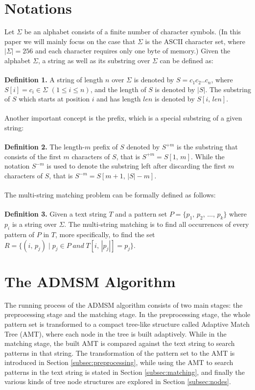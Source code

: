 \documentclass[legalpaper]{article}
\begin{document}
\section{Notations}
\label{sec:stucture}

Let $\Sigma$ be an \textsf{alphabet} consists of a finite number of
character symbols. (In this paper we will mainly focus on the case
that $\Sigma$ is the ASCII character set, where $|\Sigma| = 256$ and
each character requires only one byte of memory.) Given the alphabet
$\Sigma$, a \textsf{string} as well as its \textsf{substring} over
$\Sigma$ can be defined as:\\
\\
\textbf{Definition 1.} A \textsf{string} of length $n$ over $\Sigma$ is
denoted by $S = c_1c_2..c_n$, where $S[i] = c_i \in \Sigma$ $(1 \leq i
\leq n)$, and the length of $S$ is denoted by $|S|$. The
\textsf{substring} of $S$ which starts at position $i$ and has
length $len$ is denoted by $S[i,\,len]$.\\
\\
Another important concept is the \textsf{prefix}, which is a special
substring of a given string:\\
\\
\textbf{Definition 2.} The length-$m$ \textsf{prefix} of $S$ denoted by
$S^{+m}$ is the substring that consists of the first $m$ characters of
$S$, that is $S^{+m}=S[1,\,m]$.  While the notation $S^{-m}$ is used to
denote the substring left after discarding the first $m$ characters of $S$, that is $S^{-m} = S[m+1,\,|S|-m]$.\\
\\
The \textsf{multi-string matching} problem can be formally defined as follows: \\
\\
\textbf{Definition 3.} Given a text string $T$ and a pattern set
$P=\{p_1,\,p_2,\,\dots,\,p_k\}$ where $p_i$ is a string over $\Sigma$.
The \textsf{multi-string matching} is to find all occurrences of every
pattern of $P$ in $T$, more specifically, to find the set $R = \{(i,\,
p_j)\;|\; p_j \in P\; and\; T[i,\,|p_j|]=p_j\}$.


\section{The ADMSM Algorithm}
\label{sec:ADSM}

The running process of the ADMSM algorithm consists of two main
stages: the preprocessing stage and the matching stage. In the
preprocessing stage, the whole pattern set is transformed to a compact
tree-like structure called \textsf{Adaptive Match Tree}
(\textsf{AMT}), where each node in the tree is built adaptively. While
in the matching stage, the built \textsf{AMT} is compared against the
text string to search patterns in that string.  The transformation of
the pattern set to the \textsf{AMT} is introduced in Section
\ref{subsec:preprocessing}, while using the \textsf{AMT} to search
patterns in the text string is stated in Section
\ref{subsec:matching}, and finally the various kinds of tree node
structures are explored in Section \ref{subsec:nodes}.
\end{document}
